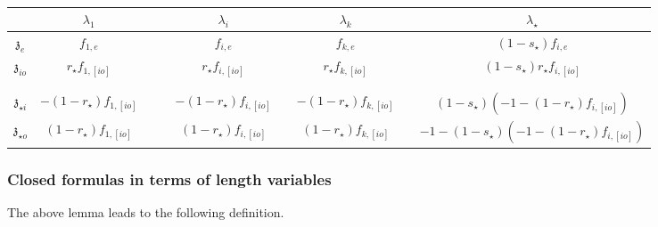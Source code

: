 \documentclass[11pt]{amsart}
\theoremstyle{definition}
\theoremstyle{remark}
\numberwithin{equation}{section}
\begin{document}
\begin{table}
  \centering
\begin{tabular}{|c|c|c|c|c|c|c|c|c|}
\hline
  & $\displaystyle \lambda _{1}$ &  &  & $\displaystyle \lambda _{i}$ &  & $\displaystyle \lambda _{k}$ &  & $\displaystyle \lambda _{\star }$ \\
\hline
 $\displaystyle \mathfrak{z}_{e}$ & $\displaystyle f_{1,e}$ &  &  & $\displaystyle f_{i,e}$ &  & $\displaystyle f_{k,e}$ &  & $\displaystyle (1-s_{\star})f_{i,e}$ \\
\hline
 $\displaystyle \mathfrak{z}_{io}$ & $\displaystyle r_{\star}f_{1,[ io]}$ &  &  & $\displaystyle r_{\star}f_{i,[ io]}$ &  & $\displaystyle r_{\star}f_{k,[ io]}$ &  & $\displaystyle (1-s_{\star})r_{\star}f_{i,[ io]}$ \\
\hline
  &  &  &  &  &  &  &  &  \\
\hline
  &  &  &  &  &  &  &  &  \\
\hline
 $\displaystyle \mathfrak{z}_{\star i}$ & $\displaystyle -( 1-r_{\star}) f_{1,[ io]}$ &  &  & $\displaystyle -( 1-r_{\star}) f_{i,[ io]}$ &  & $\displaystyle -( 1-r_{\star}) f_{k,[ io]}$ &  & $\displaystyle (1-s_{\star})( -1-( 1-r_{\star}) f_{i,[ io]})$ \\
\hline
 $\displaystyle \mathfrak{z}_{\star o}$ & $\displaystyle ( 1-r_{\star}) f_{1,[ io]}$ &  &  & $\displaystyle ( 1-r_{\star}) f_{i,[ io]}$ &  & $\displaystyle ( 1-r_{\star}) f_{k,[ io]}$ &  & $\displaystyle -1-(1-s_{\star})( -1-( 1-r_{\star}) f_{i,[ io]})$ \\
 \hline
\end{tabular}

  \caption{}\label{}
\end{table}
\fi

\subsubsection{Closed formulas in terms of length variables}
The above lemma leads to the following definition.
\end{document}
